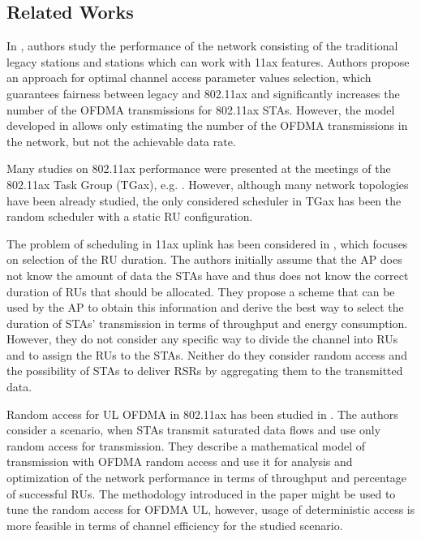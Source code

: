 \subsection{Related Works}

In \cite{khorov2016several}, authors study the performance of the network consisting of the traditional legacy stations and stations which can work with 11ax features.
Authors propose an approach for optimal channel access parameter values selection, which guarantees fairness between legacy and 802.11ax and significantly increases the number of the OFDMA transmissions for 802.11ax STAs.
However, the model developed in \cite{khorov2016several} allows only estimating the number of the OFDMA transmissions in the network, but not the achievable data rate. 

Many studies on 802.11ax performance were presented at the meetings of the 802.11ax Task Group (TGax), e.g. \cite{ofdma-par1, ofdma-par2}.
However, although many network topologies have been already studied, the only considered scheduler in TGax has been the random scheduler with a static RU configuration.

The problem of scheduling in 11ax uplink has been considered in \cite{karaca2016resource}, which focuses on selection of the RU duration.
The authors initially assume that the AP does not know the amount of data the STAs have and thus does not know the correct duration of RUs that should be allocated.
They propose a scheme that can be used by the AP to obtain this information and derive the best way to select the duration of STAs' transmission in terms of throughput and energy consumption.
However, they do not consider any specific way to divide the channel into RUs and to assign the RUs to the STAs.
Neither do they consider random access and the possibility of STAs to deliver RSRs by aggregating them to the transmitted data.


Random access for UL OFDMA in 802.11ax has been studied in \cite{lanante2017performance}.
The authors consider a scenario, when STAs transmit saturated data flows and use only random access for transmission.
They describe a mathematical model of transmission with OFDMA random access and use it for analysis and optimization of the network performance in terms of throughput and percentage of successful RUs.
The methodology introduced in the paper might be used to tune the random access for OFDMA UL, however, usage of deterministic access is more feasible in terms of channel efficiency for the studied scenario.


